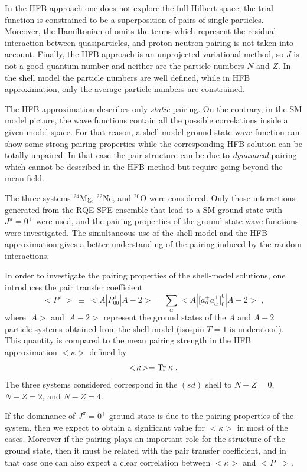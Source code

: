 \documentclass[rmp,aps,floatfix]{revtex4}
\begin{document}
In the HFB approach
one does not explore the full Hilbert space; the trial function
is constrained to be a superposition of pairs of single particles.
Moreover, the Hamiltonian of \cite{ben02} omits
the terms which represent the residual interaction between quasiparticles, 
and proton-neutron pairing is not taken into account.
Finally, the HFB approach is an unprojected
variational method, so $J$ is not a good quantum number
and neither are the particle numbers $N$ and $Z$.
In the shell model the particle numbers are well defined, while in HFB
approximation, only the average particle numbers are constrained.

The HFB approximation describes
only {\it static} pairing. On the contrary, in the SM model picture, the
wave functions contain all the possible correlations inside a given model
space. For that reason, a shell-model ground-state 
wave function can show some strong pairing
properties while the corresponding HFB solution can be totally unpaired.
In that case the pair structure can be due to {\it dynamical} pairing
which cannot be described in the HFB method but require going beyond
the mean field.

The three 
systems $^{24}$Mg, $^{22}$Ne, and $^{20}$O were considered. 
Only those interactions generated from the RQE-SPE ensemble
that lead to a SM ground state with $J^\pi=0^+$ were used,
and 
the pairing properties of the ground state
wave functions were investigated. The simultaneous use of the shell model 
and the HFB approximation gives a better understanding of the pairing
induced by the random interactions.

In order to investigate the pairing properties of the shell-model
solutions, one introduces the pair transfer coefficient
%
\begin{equation}
<P^+>\,\equiv\,<A|P^+_{00}|A-2>
=\sum_{\alpha}<A|\big[a_\alpha^+a_{\bar\alpha}^+\big]^0_0|A-2>\;,
\end{equation}
%
where $|A>$ and $|A-2>$ represent the ground states of the $A$ and $A-2$
particle systems obtained from the shell model (isospin $T=1$ is understood).
This quantity is compared
to the mean pairing strength in the HFB approximation $<\kappa>$ defined
by
%
\begin{equation}
<\!\kappa\!>={\rm Tr}\;\kappa\;.
\end{equation}
%
The three systems considered correspond
in the $(sd)$ shell to $N-Z=0$, $N-Z=2$, and
$N-Z=4$. 

If the dominance of $J^\pi=0^+$ ground state is due to the pairing
properties of the system, then we expect to obtain a significant value
for $<\!\kappa\!>$ in most of the cases. Moreover if the pairing plays
an important role for the structure of the ground state, then it must
be related with the pair transfer coefficient, and in that case one can
also expect a clear correlation between $<\!\kappa\!>$ and $<\!P^+\!>$.
\end{document}
